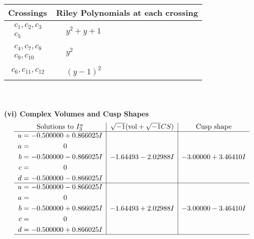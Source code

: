 \documentclass[1p]{elsarticle_modified}
\theoremstyle{definition}
\newcommand{\I}{\sqrt{-1}}
\begin{document}
\begin{tabular}{m{50pt}|m{274pt}}
Crossings & \hspace{64pt}Riley Polynomials at each crossing \\
\hline $$\begin{aligned}c_{1},c_{2},c_{3}\\c_{5}\end{aligned}$$&$\begin{aligned}
&y^2+y+1
\end{aligned}$\\
\hline $$\begin{aligned}c_{4},c_{7},c_{8}\\c_{9},c_{10}\end{aligned}$$&$\begin{aligned}
&y^2
\end{aligned}$\\
\hline $$\begin{aligned}c_{6},c_{11},c_{12}\end{aligned}$$&$\begin{aligned}
&(y-1)^2
\end{aligned}$\\
\hline
\end{tabular}\\~\\
\newpage\flushleft \textbf{(vi) Complex Volumes and Cusp Shapes}
$$\begin{array}{c|c|c}  
\text{Solutions to }I^u_{3}& \I (\text{vol} + \sqrt{-1}CS) & \text{Cusp shape}\\
 \hline 
\begin{aligned}
u &= -0.500000 + 0.866025 I \\
a &= \phantom{-0.000000 } 0 \\
b &= -0.500000 - 0.866025 I \\
c &= \phantom{-0.000000 } 0 \\
d &= -0.500000 - 0.866025 I\end{aligned}
 & -1.64493 - 2.02988 I & -3.00000 + 3.46410 I \\ \hline\begin{aligned}
u &= -0.500000 - 0.866025 I \\
a &= \phantom{-0.000000 } 0 \\
b &= -0.500000 + 0.866025 I \\
c &= \phantom{-0.000000 } 0 \\
d &= -0.500000 + 0.866025 I\end{aligned}
 & -1.64493 + 2.02988 I & -3.00000 - 3.46410 I\\
 \hline 
 \end{array}$$\newpage\newpage\renewcommand{\arraystretch}{1}
\end{document}
